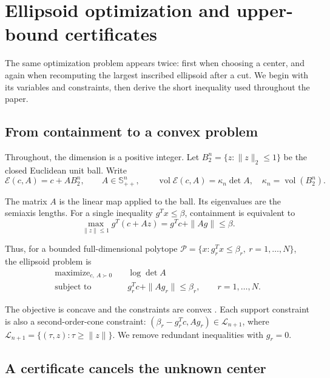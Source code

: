\section{Ellipsoid optimization and upper-bound certificates}\label{sec:2}

The same optimization problem appears twice: first when choosing a center, and again when recomputing the largest inscribed ellipsoid after a cut. We begin with its variables and constraints, then derive the short inequality used throughout the paper.

\subsection{From containment to a convex problem}\label{sec:2.1}

Throughout, the dimension is a positive integer. Let $B_2^n=\{z:\|z\|_2\le1\}$ be the closed Euclidean unit ball. Write
\begin{equation}\label{eq:2.1}
\mathcal E(c,A)=c+AB_2^n,\qquad A\in\mathbb S_{++}^n,
\qquad \operatorname{vol}\mathcal E(c,A)=\kappa_n\det A,
\quad \kappa_n=\operatorname{vol}(B_2^n).
\end{equation}

The matrix $A$ is the linear map applied to the ball. Its eigenvalues are the semiaxis lengths. For a single inequality $g^Tx\le\beta$, containment is equivalent to
\begin{equation}\label{eq:2.2}
\max_{\|z\|\le1}g^T(c+Az)=g^Tc+\|Ag\|\le\beta.
\end{equation}

Thus, for a bounded full-dimensional polytope
$\mathcal P=\{x:g_r^Tx\le\beta_r,\ r=1,\ldots,N\}$, the ellipsoid problem is
\begin{equation}\label{eq:2.3}
\begin{aligned}
\text{maximize}_{c,\ A\succ0}\quad&\log\det A\\
\text{subject to}\quad&g_r^Tc+\|Ag_r\|\le\beta_r,
\qquad r=1,\ldots,N.
\end{aligned}
\end{equation}

The objective is concave and the constraints are convex \cite[Section 8.4.2]{BV2004}. Each support constraint is also a second-order-cone constraint:
$(\beta_r-g_r^Tc,Ag_r)\in\mathcal L_{n+1}$, where
$\mathcal L_{n+1}=\{(\tau,z):\tau\ge\|z\|\}$.
We remove redundant inequalities with $g_r=0$.

\subsection{A certificate cancels the unknown center}\label{sec:2.2}

